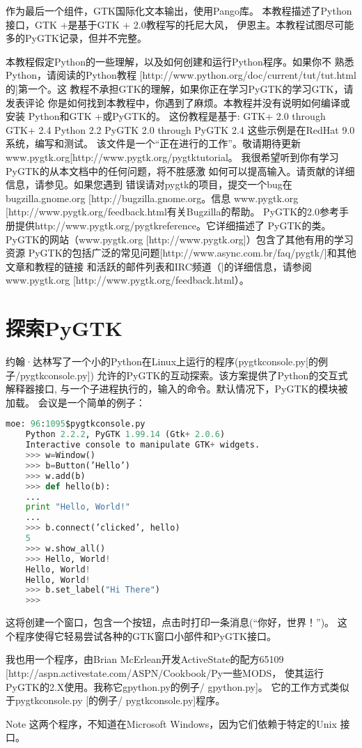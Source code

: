 	作为最后一个组件，GTK国际化文本输出，使用Pango库。
	本教程描述了Python接口，GTK +是基于GTK + 2.0教程写的托尼大风，
	伊恩主。本教程试图尽可能多的PyGTK记录，但并不完整。

	本教程假定Python的一些理解，以及如何创建和运行Python程序。如果你不
	熟悉Python，请阅读的Python教程
	[http://www.python.org/doc/current/tut/tut.html的]第一个。这
	教程不承担GTK的理解，如果你正在学习PyGTK的学习GTK，请发表评论
	你是如何找到本教程中，你遇到了麻烦。本教程并没有说明如何编译或安装
	Python和GTK +或PyGTK的。
	这份教程是基于:
	GTK+ 2.0 through GTK+ 2.4
	Python 2.2
	PyGTK 2.0 through PyGTK 2.4
	这些示例是在RedHat 9.0系统，编写和测试。
	该文件是一个“正在进行的工作”。敬请期待更新www.pygtk.org[http://www.pygtk.org/pygtktutorial。
	我很希望听到你有学习PyGTK的从本文档中的任何问题，将不胜感激
	如何可以提高输入。请贡献的详细信息，请参见。如果您遇到
	错误请对pygtk的项目，提交一个bug在bugzilla.gnome.org [http://bugzilla.gnome.org。信息
	www.pygtk.org [http://www.pygtk.org/feedback.html有关Bugzilla的帮助。
	PyGTK的2.0参考手册提供http://www.pygtk.org/pygtkreference。它详细描述了
	PyGTK的类。
	PyGTK的网站（www.pygtk.org [http://www.pygtk.org]）包含了其他有用的学习资源
	PyGTK的包括广泛的常见问题[http://www.async.com.br/faq/pygtk/]和其他文章和教程的链接
	和活跃的邮件列表和IRC频道（]的详细信息，请参阅www.pygtk.org [http://www.pygtk.org/feedback.html）。	
	\section{探索PyGTK}
	约翰·达林写了一个小的Python在Linux上运行的程序(pygtkconsole.py[的例子/pygtkconsole.py])
	允许的PyGTK的互动探索。该方案提供了Python的交互式解释器接口,
	与一个子进程执行的，输入的命令。默认情况下，PyGTK的模块被加载。
	会议是一个简单的例子：
	{
	\begin{lstlisting}[language=Python]
	moe: 96:1095$pygtkconsole.py
	Python 2.2.2, PyGTK 1.99.14 (Gtk+ 2.0.6)
	Interactive console to manipulate GTK+ widgets.
	>>> w=Window()
	>>> b=Button(’Hello’)
	>>> w.add(b)
	>>> def hello(b):
	...
	print "Hello, World!"
	...
	>>> b.connect(’clicked’, hello)
	5
	>>> w.show_all()
	>>> Hello, World!
	Hello, World!
	Hello, World!
	>>> b.set_label("Hi There")
	>>>
	\end{lstlisting}
}
	这将创建一个窗口，包含一个按钮，点击时打印一条消息(“你好，世界！”)。
	这个程序使得它轻易尝试各种的GTK窗口小部件和PyGTK接口。
	

	我也用一个程序，由Brian McErlean开发ActiveState的配方65109 
	[http://aspn.activestate.com/ASPN/Cookbook/Py一些MODS，
	使其运行PyGTK的2.X使用。我称它gpython.py的例子/ gpython.py]。
	它的工作方式类似于pygtkconsole.py [的例子/ pygtkconsole.py]程序。

	Note
	这两个程序，不知道在Microsoft Windows，因为它们依赖于特定的Unix
	接口。
